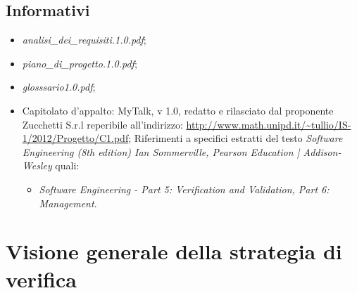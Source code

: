 \subsection{Informativi}
\begin{itemize}
\item[] \textit{analisi\_dei\_requisiti.1.0.pdf};
\item[] \textit{piano\_di\_progetto.1.0.pdf};
\item[] \textit{glosssario1.0.pdf};
\item[] Capitolato d'appalto: MyTalk, v 1.0, redatto e rilasciato dal proponente Zucchetti S.r.l reperibile all'indirizzo: \url{http://www.math.unipd.it/~tullio/IS-1/2012/Progetto/C1.pdf};
Riferimenti a specifici estratti del testo \textit{Software Engineering (8th edition) Ian Sommerville, Pearson Education | Addison-Wesley} quali:
\begin{itemize}
\item[]  \textit{Software Engineering - Part 5: Verification and Validation, Part 6: Management}.\\
\end{itemize}
\end{itemize}
\clearpage
\section{Visione generale della strategia di verifica}
